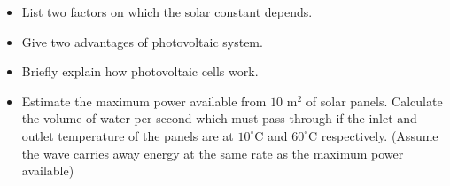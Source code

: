 \documentclass{article}
\begin{document}
\begin{itemize}
\item List two factors on which the solar constant depends. 
\item Give two advantages of photovoltaic system. 
\item Briefly explain how photovoltaic cells work. 
\item Estimate the maximum power available from $ 10$ m$ ^{2}$ of solar panels.  Calculate the volume of water per second which must pass through if the inlet and outlet temperature of the panels are at $ 10^{\circ}$C and $ 60^{\circ}$C respectively. (Assume the wave carries away energy at the same rate as the maximum power available)
\end{itemize}
\end{document}
